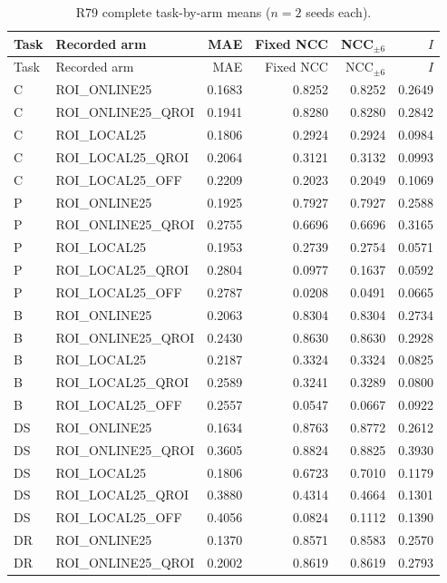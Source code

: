 \begingroup\scriptsize\setlength{\tabcolsep}{2pt}
\begin{longtable}{lp{.30\linewidth}rrrr}
\caption{R79 complete task-by-arm means ($n=2$ seeds each).}\\
\hline
Task & Recorded arm & MAE & Fixed NCC & NCC$_{\pm6}$ & $I$ \\ \hline
\endfirsthead
\hline
Task & Recorded arm & MAE & Fixed NCC & NCC$_{\pm6}$ & $I$ \\ \hline
\endhead
C & ROI\_ONLINE25 & 0.1683 & 0.8252 & 0.8252 & 0.2649 \\
C & ROI\_ONLINE25\_QROI & 0.1941 & 0.8280 & 0.8280 & 0.2842 \\
C & ROI\_LOCAL25 & 0.1806 & 0.2924 & 0.2924 & 0.0984 \\
C & ROI\_LOCAL25\_QROI & 0.2064 & 0.3121 & 0.3132 & 0.0993 \\
C & ROI\_LOCAL25\_OFF & 0.2209 & 0.2023 & 0.2049 & 0.1069 \\
P & ROI\_ONLINE25 & 0.1925 & 0.7927 & 0.7927 & 0.2588 \\
P & ROI\_ONLINE25\_QROI & 0.2755 & 0.6696 & 0.6696 & 0.3165 \\
P & ROI\_LOCAL25 & 0.1953 & 0.2739 & 0.2754 & 0.0571 \\
P & ROI\_LOCAL25\_QROI & 0.2804 & 0.0977 & 0.1637 & 0.0592 \\
P & ROI\_LOCAL25\_OFF & 0.2787 & 0.0208 & 0.0491 & 0.0665 \\
B & ROI\_ONLINE25 & 0.2063 & 0.8304 & 0.8304 & 0.2734 \\
B & ROI\_ONLINE25\_QROI & 0.2430 & 0.8630 & 0.8630 & 0.2928 \\
B & ROI\_LOCAL25 & 0.2187 & 0.3324 & 0.3324 & 0.0825 \\
B & ROI\_LOCAL25\_QROI & 0.2589 & 0.3241 & 0.3289 & 0.0800 \\
B & ROI\_LOCAL25\_OFF & 0.2557 & 0.0547 & 0.0667 & 0.0922 \\
DS & ROI\_ONLINE25 & 0.1634 & 0.8763 & 0.8772 & 0.2612 \\
DS & ROI\_ONLINE25\_QROI & 0.3605 & 0.8824 & 0.8825 & 0.3930 \\
DS & ROI\_LOCAL25 & 0.1806 & 0.6723 & 0.7010 & 0.1179 \\
DS & ROI\_LOCAL25\_QROI & 0.3880 & 0.4314 & 0.4664 & 0.1301 \\
DS & ROI\_LOCAL25\_OFF & 0.4056 & 0.0824 & 0.1112 & 0.1390 \\
DR & ROI\_ONLINE25 & 0.1370 & 0.8571 & 0.8583 & 0.2570 \\
DR & ROI\_ONLINE25\_QROI & 0.2002 & 0.8619 & 0.8619 & 0.2793 \\

\end{longtable}
